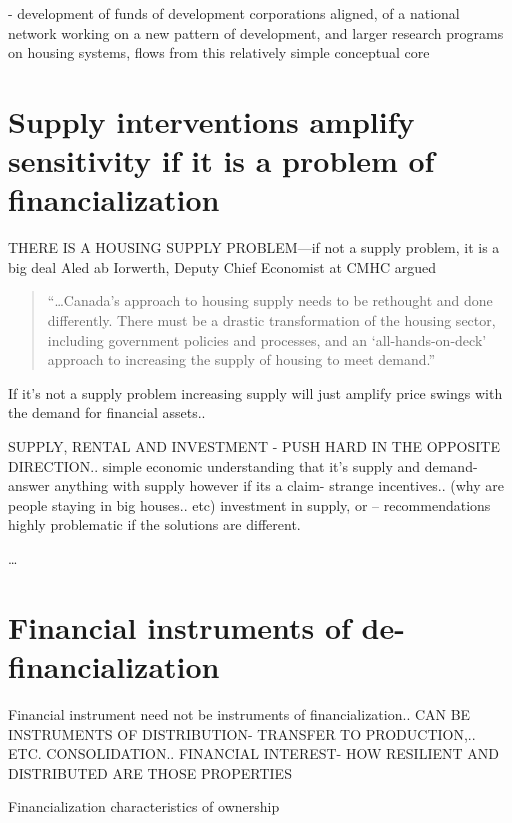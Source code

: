 
 - development of funds of development corporations aligned, of a national network working on a new pattern of development, and larger research programs on housing systems, flows from this relatively simple conceptual core

\section{Supply interventions amplify sensitivity if it is a problem of financialization}

THERE IS A HOUSING SUPPLY PROBLEM---if not a supply problem, it is a big deal
Aled ab Iorwerth, Deputy Chief Economist at CMHC argued
\begin{quotation}
     ``\dots Canada's approach to housing supply needs to be rethought and done differently. There must be a drastic transformation of the housing sector, including government policies and processes, and an `all-hands-on-deck' approach to increasing the supply of housing to meet demand.'' \cite{CanadaHousingSupply2022}
\end{quotation}

If it's not a supply problem increasing supply will just amplify price swings with the demand for financial assets..


SUPPLY, RENTAL AND INVESTMENT - PUSH HARD IN THE OPPOSITE DIRECTION..
simple economic understanding that it's supply and demand- answer anything with supply
however if its a claim- strange incentives.. (why are people staying in big houses.. etc)
investment in supply, or 
-- recommendations highly problematic if the solutions are different. 

\dots

\section{Financial instruments of de-financialization}
Financial instrument need not be instruments of financialization..
CAN BE INSTRUMENTS OF DISTRIBUTION- TRANSFER TO PRODUCTION,.. ETC. CONSOLIDATION.. FINANCIAL INTEREST- HOW RESILIENT AND DISTRIBUTED ARE THOSE PROPERTIES

Financialization
characteristics of ownership

